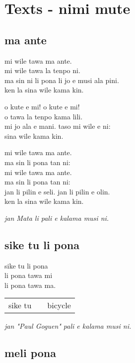 \section{Texts - nimi mute}
\subsection{ma ante}

mi wile tawa ma ante. \\
mi wile tawa la tenpo ni.   \\
ma sin ni li pona li jo e musi ala pini. \\
ken la sina wile kama kin.  

o kute e mi! o kute e mi!  \\
o tawa la tenpo kama lili.    \\
mi jo ala e mani. taso mi wile e ni: \\
sina wile kama kin. 

mi wile tawa ma ante. \\
ma sin li pona tan ni: \\
mi wile tawa ma ante. \\
ma sin li pona tan ni: \\
jan li pilin e seli. jan li pilin e olin. \\
ken la sina wile kama kin. 

\textit{jan Mata li pali e kalama musi ni. \cite{www:Mata:01,www:Mata:02}}
%
\subsection{sike tu li pona}

sike tu li pona  \\
li pona tawa mi  \\
li pona tawa ma. 

\begin{supertabular}{p{5,5cm}|ll}
sike tu && bicycle \\ 
\end{supertabular}

\textit{jan "Paul Goguen"  pali e kalama musi ni. \cite{www:PaulGoguen:01}}
%
\subsection{meli pona}

